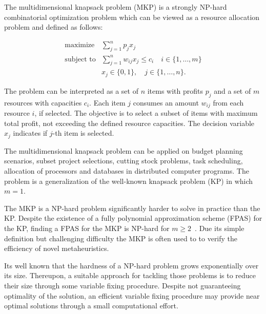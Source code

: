 
The multidimensional knapsack problem (MKP) is a strongly NP-hard combinatorial
optimization problem which can be viewed as a resource allocation problem and
defined as follows:

\begin{align*}
  \text{maximize} & \sum_{j=1}^n p_j x_j \\
  \text{subject to} & \sum_{j=1}^n w_{ij} x_j \leqslant c_i \quad i \in \{1, \ldots, m\}\\
   & x_j \in \{0, 1\}, \quad j \in \{1, \ldots, n\}.
\end{align*}

The problem can be interpreted as a set of $n$ items with profits $p_j$
and a set of $m$ resources with capacities $c_i$.
Each item $j$ consumes an amount $w_{ij}$ from each resource $i$, if selected.
The objective is to select a subset of items with maximum total profit,
not exceeding the defined resource capacities.
The decision variable $x_j$ indicates if $j$-th item is selected.

The multidimensional knapsack problem can be applied on budget planning 
scenarios, subset project selections, cutting stock problems, task scheduling,
allocation of processors and databases in distributed computer programs.
The problem is a generalization of the well-known knapsack problem (KP) in which
$m = 1$.

The MKP is a NP-hard problem significantly harder to solve in practice than the KP.
Despite the existence of a fully polynomial approximation scheme (FPAS) for the KP,
finding a FPAS for the MKP is NP-hard for $m \geqslant 2$~\cite{magazine1984note}.
Due its simple definition but challenging difficulty the MKP is often used to
to verify the efficiency of novel metaheuristics.

Its well known that the hardness of a NP-hard problem grows exponentially over
its size.
Thereupon, a suitable approach for tackling those problems is to reduce their size
through some variable fixing procedure.
Despite not guaranteeing optimality of the solution, an efficient variable
fixing procedure may provide near optimal solutions through a small computational effort.



